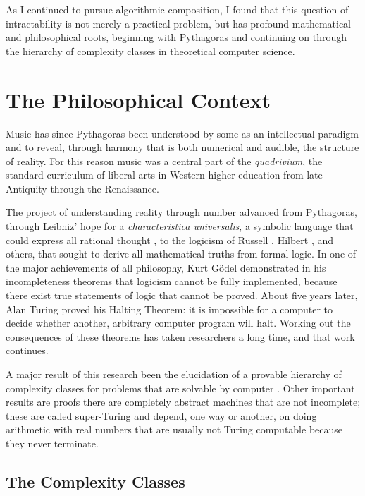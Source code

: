 \documentclass[11pt]{scrartcl}
\begin{document}
As I continued to pursue algorithmic composition, I found that this question of intractability is not merely a practical problem, but has profound mathematical and philosophical roots, beginning with Pythagoras and continuing on through the hierarchy of complexity classes in theoretical computer science.

\section*{The Philosophical Context}

Music has since Pythagoras \parencite{sep-pythagoras, huffman2014history} been understood by some as an intellectual paradigm and to reveal, through harmony that is both numerical and audible, the structure of reality. For this reason music was a central part of the \emph{quadrivium}, the standard curriculum of liberal arts in Western higher education from late Antiquity through the Renaissance.

The project of understanding reality through number advanced from Pythagoras, through Leibniz' 
hope for a \emph{characteristica universalis}, a symbolic language that could express all rational thought \parencite{davis2018universal}, to the logicism of Russell \parencite{sep-logicism}, Hilbert \parencite{sep-hilbert-program}, and others, that sought to derive all mathematical truths from formal logic. In one of the major achievements of all philosophy, Kurt Gödel \parencite{godel1986} demonstrated in his incompleteness theorems that logicism cannot be fully implemented, because there exist true statements of logic that cannot  be proved. About five years later, Alan Turing proved his Halting Theorem: it is impossible for a computer to decide whether another, arbitrary computer program will halt. Working out the consequences of these theorems has taken researchers a long time, and that work continues. 

A major result of this research been the elucidation of a provable hierarchy of complexity classes for problems that are solvable by computer \parencite{arora2009computational}. Other important results are proofs there are completely abstract machines that are not incomplete; these are called super-Turing and depend, one way or another, on doing arithmetic with real numbers that are usually not Turing computable because they never terminate. 

 \subsection*{The Complexity Classes} \label{sec:complexity}
 
\end{document}
